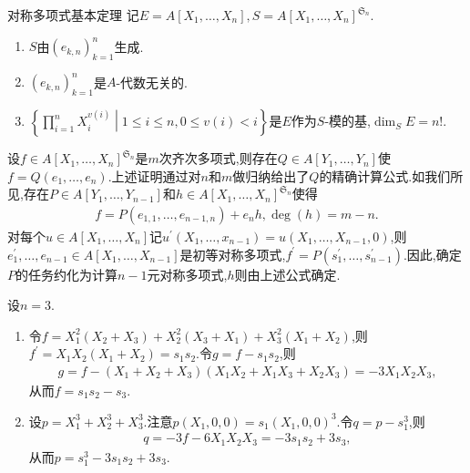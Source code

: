 \begin{theorem}{对称多项式基本定理}{}
	记$E=A[X_{1},\ldots,X_{n}],S=A[X_{1},\ldots,X_{n}]^{\mathfrak{S}_{n}}$.
	\begin{enumerate}
		\item $S$由$\left(e_{k,n}\right)_{k=1}^{n}$生成.
		\item $\left(e_{k,n}\right)_{k=1}^{n}$是$A$-代数无关的.
		\item $\left\{\prod\limits_{i=1}^{n}X_{i}^{v\left(i\right)}\middle|1\leq i\leq n,0\leq v\left(i\right)<i\right\}$是$E$作为$S$-模的基,$\dim _{S}E=n!$.
	\end{enumerate}
\end{theorem}

\begin{remark}{}{}
	设$f\in A[X_{1},\ldots,X_{n}]^{\mathfrak{S}_{n}}$是$m$次齐次多项式,则存在$Q\in A[Y_{1},\ldots,Y_{n}]$使$f=Q\left(e_{1},\ldots,e_{n}\right)$.上述证明通过对$n$和$m$做归纳给出了$Q$的精确计算公式.如我们所见,存在$P\in A[Y_{1},\ldots,Y_{n-1}]$和$h\in A[X_{1},\ldots,X_{n}]^{\mathfrak{S}_{n}}$使得
	\begin{align*}
		f=P\left(e_{1,1},\ldots,e_{n-1,n}\right)+e_{n}h,\deg\left(h\right)=m-n.
	\end{align*}
	对每个$u\in A[X_{1},\ldots,X_{n}]$记$u^{\prime}\left(X_{1},\ldots,x_{n-1}\right)=u\left(X_{1},\ldots,X_{n-1},0\right)$,则$e_{1}^{\prime},\ldots,e_{n-1}\in A[X_{1},\ldots,X_{n-1}]$是初等对称多项式,$f^{\prime}=P\left(s_{1}^{\prime},\ldots,s_{n-1}^{\prime}\right)$.因此,确定$P$的任务约化为计算$n-1$元对称多项式,$h$则由上述公式确定.
\end{remark}

\begin{example}{}{}
	设$n=3$.
	\begin{enumerate}
		\item 令$f=X_{1}^{2}\left(X_{2}+X_{3}\right)+X_{2}^{2}\left(X_{3}+X_{1}\right)+X_{3}^{2}\left(X_{1}+X_{2}\right)$,则$f^{\prime}=X_{1}X_{2}\left(X_{1}+X_{2}\right)=s_{1}s_{2}$.令$g=f-s_{1}s_{2}$,则
		\begin{align*}
			g=f-\left(X_{1}+X_{2}+X_{3}\right)\left(X_{1}X_{2}+X_{1}X_{3}+X_{2}X_{3}\right)=-3X_{1}X_{2}X_{3},
		\end{align*}
		从而$f=s_{1}s_{2}-s_{3}$.
		\item 设$p=X_{1}^{3}+X_{2}^{3}+X_{3}^{3}$.注意$p\left(X_{1},0,0\right)=s_{1}\left(X_{1},0,0\right)^{3}$.令$q=p-s_{1}^{3}$,则
		\begin{align*}
			q=-3f-6X_{1}X_{2}X_{3}=-3s_{1}s_{2}+3s_{3},
		\end{align*}
		从而$p=s_{1}^{3}-3s_{1}s_{2}+3s_{3}$.
	\end{enumerate}
\end{example}

